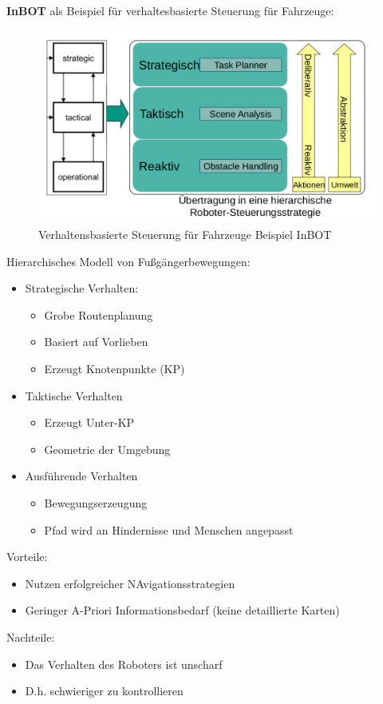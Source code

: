 \textbf{InBOT} als Beispiel für verhaltesbasierte Steuerung für Fahrzeuge:
\begin{figure}
	\includegraphics[width=\textwidth]{figures/inbot.png}
	\caption{Verhaltensbasierte Steuerung für Fahrzeuge Beispiel InBOT}
	\label{ch:08:fig:inbot}
\end{figure}
Hierarchisches Modell von Fußgängerbewegungen:
\begin{itemize}
	\item Strategische Verhalten:
	\begin{itemize}
		\item Grobe Routenplanung
		\item Basiert auf Vorlieben
		\item Erzeugt Knotenpunkte (KP)
	\end{itemize}
	\item Taktische Verhalten
	\begin{itemize}
		\item Erzeugt Unter-KP
		\item Geometrie der Umgebung
	\end{itemize}
	\item Ausführende Verhalten
	\begin{itemize}
		\item Bewegungserzeugung
		\item Pfad wird an Hindernisse und Menschen angepasst
	\end{itemize}
\end{itemize}

Vorteile:
\begin{itemize}
	\item Nutzen erfolgreicher NAvigationsstrategien
	\item Geringer A-Priori Informationsbedarf (keine detaillierte Karten)
\end{itemize}
Nachteile:
\begin{itemize}
	\item Das Verhalten des Roboters ist unscharf
	\item D.h. schwieriger zu kontrollieren
\end{itemize}

